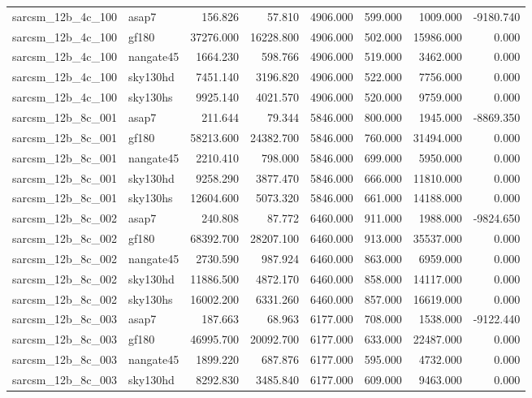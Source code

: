 \begin{tabular}{llrrrrrr}
sarcsm\_12b\_4c\_100 & asap7 & 156.826 & 57.810 & 4906.000 & 599.000 & 1009.000 & -9180.740 \\
sarcsm\_12b\_4c\_100 & gf180 & 37276.000 & 16228.800 & 4906.000 & 502.000 & 15986.000 & 0.000 \\
sarcsm\_12b\_4c\_100 & nangate45 & 1664.230 & 598.766 & 4906.000 & 519.000 & 3462.000 & 0.000 \\
sarcsm\_12b\_4c\_100 & sky130hd & 7451.140 & 3196.820 & 4906.000 & 522.000 & 7756.000 & 0.000 \\
sarcsm\_12b\_4c\_100 & sky130hs & 9925.140 & 4021.570 & 4906.000 & 520.000 & 9759.000 & 0.000 \\
sarcsm\_12b\_8c\_001 & asap7 & 211.644 & 79.344 & 5846.000 & 800.000 & 1945.000 & -8869.350 \\
sarcsm\_12b\_8c\_001 & gf180 & 58213.600 & 24382.700 & 5846.000 & 760.000 & 31494.000 & 0.000 \\
sarcsm\_12b\_8c\_001 & nangate45 & 2210.410 & 798.000 & 5846.000 & 699.000 & 5950.000 & 0.000 \\
sarcsm\_12b\_8c\_001 & sky130hd & 9258.290 & 3877.470 & 5846.000 & 666.000 & 11810.000 & 0.000 \\
sarcsm\_12b\_8c\_001 & sky130hs & 12604.600 & 5073.320 & 5846.000 & 661.000 & 14188.000 & 0.000 \\
sarcsm\_12b\_8c\_002 & asap7 & 240.808 & 87.772 & 6460.000 & 911.000 & 1988.000 & -9824.650 \\
sarcsm\_12b\_8c\_002 & gf180 & 68392.700 & 28207.100 & 6460.000 & 913.000 & 35537.000 & 0.000 \\
sarcsm\_12b\_8c\_002 & nangate45 & 2730.590 & 987.924 & 6460.000 & 863.000 & 6959.000 & 0.000 \\
sarcsm\_12b\_8c\_002 & sky130hd & 11886.500 & 4872.170 & 6460.000 & 858.000 & 14117.000 & 0.000 \\
sarcsm\_12b\_8c\_002 & sky130hs & 16002.200 & 6331.260 & 6460.000 & 857.000 & 16619.000 & 0.000 \\
sarcsm\_12b\_8c\_003 & asap7 & 187.663 & 68.963 & 6177.000 & 708.000 & 1538.000 & -9122.440 \\
sarcsm\_12b\_8c\_003 & gf180 & 46995.700 & 20092.700 & 6177.000 & 633.000 & 22487.000 & 0.000 \\
sarcsm\_12b\_8c\_003 & nangate45 & 1899.220 & 687.876 & 6177.000 & 595.000 & 4732.000 & 0.000 \\
sarcsm\_12b\_8c\_003 & sky130hd & 8292.830 & 3485.840 & 6177.000 & 609.000 & 9463.000 & 0.000 \\

\end{tabular}
